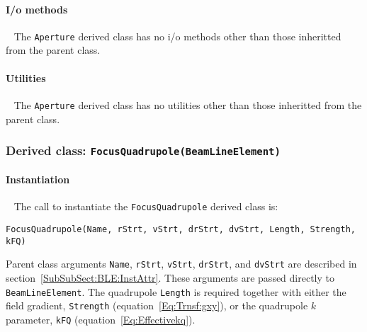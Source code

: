 \FloatBarrier

\paragraph{I/o methods} ~\newline
\noindent
The \texttt{Aperture} derived class has no i/o methods other than
those inheritted from the parent class.

\paragraph{Utilities} ~\newline
\noindent
The \texttt{Aperture} derived class has no utilities other than those
inheritted from the parent class. 

\subsubsection{Derived class: \texttt{FocusQuadrupole(BeamLineElement)}}

\paragraph{Instantiation} ~\newline
\noindent
The call to instantiate the \texttt{FocusQuadrupole} derived class is:
\begin{center}
  \texttt{FocusQuadrupole(Name, rStrt, vStrt, drStrt, dvStrt, Length,
          Strength, kFQ)} 
\end{center}
Parent class arguments \texttt{Name}, \texttt{rStrt}, \texttt{vStrt},
\texttt{drStrt}, and \texttt{dvStrt} are described in
section~\ref{SubSubSect:BLE:InstAttr}.
These arguments are passed directly to \texttt{BeamLineElement}.
The quadrupole \texttt{Length} is required together with
either the field gradient, \texttt{Strength}
(equation~\ref{Eq:Trnsf:gxy}), or the quadrupole $k$
parameter, \texttt{kFQ} (equation~\ref{Eq:Effectivekq}).

